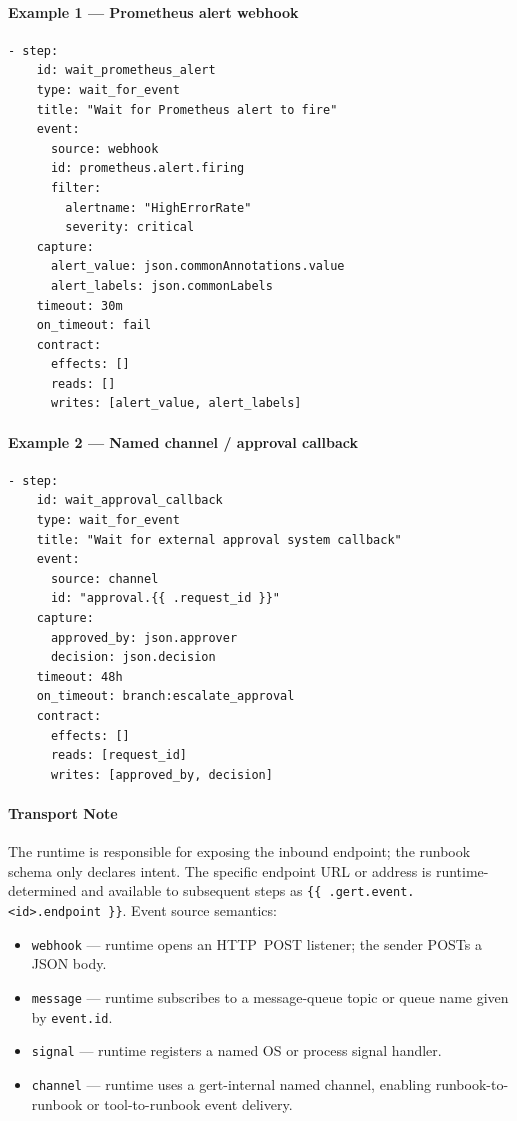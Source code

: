 \paragraph{Example 1 — Prometheus alert webhook}

\begin{verbatim}
- step:
    id: wait_prometheus_alert
    type: wait_for_event
    title: "Wait for Prometheus alert to fire"
    event:
      source: webhook
      id: prometheus.alert.firing
      filter:
        alertname: "HighErrorRate"
        severity: critical
    capture:
      alert_value: json.commonAnnotations.value
      alert_labels: json.commonLabels
    timeout: 30m
    on_timeout: fail
    contract:
      effects: []
      reads: []
      writes: [alert_value, alert_labels]
\end{verbatim}

\paragraph{Example 2 — Named channel / approval callback}

\begin{verbatim}
- step:
    id: wait_approval_callback
    type: wait_for_event
    title: "Wait for external approval system callback"
    event:
      source: channel
      id: "approval.{{ .request_id }}"
    capture:
      approved_by: json.approver
      decision: json.decision
    timeout: 48h
    on_timeout: branch:escalate_approval
    contract:
      effects: []
      reads: [request_id]
      writes: [approved_by, decision]
\end{verbatim}

\paragraph{Transport Note}

The runtime is responsible for exposing the inbound endpoint; the runbook schema
only declares intent.  The specific endpoint URL or address is runtime-determined
and available to subsequent steps as \texttt{\{\{\ .gert.event.<id>.endpoint\ \}\}}.
Event source semantics:
\begin{itemize}
  \item \texttt{webhook} — runtime opens an HTTP~POST listener; the sender POSTs a JSON body.
  \item \texttt{message} — runtime subscribes to a message-queue topic or queue name
        given by \texttt{event.id}.
  \item \texttt{signal} — runtime registers a named OS or process signal handler.
  \item \texttt{channel} — runtime uses a gert-internal named channel, enabling
        runbook-to-runbook or tool-to-runbook event delivery.
\end{itemize}

